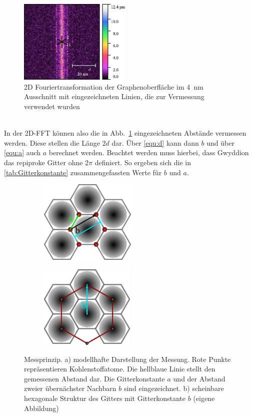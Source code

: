 \documentclass[a4paper,twoside,final]{article}
\begin{document}
\begin{figure}[htp]
  \centering
  \vspace{-3mm}
    \includegraphics[height=4cm]{Bilder/Image02001_2DFFT.pdf}
    \caption{2D Fouriertransformation der Graphenoberfläche im \SI{4}{\nano\meter} Ausschnitt mit eingezeichneten Linien, die zur Vermessung verwendet wurden}
    \label{fig:2DFFT_Graphen}
\end{figure}\\
In der 2D-FFT können also die in Abb.~\ref{fig:2DFFT_Graphen} eingezeichneten Abstände vermessen werden. Diese stellen die Länge $2d$ dar. Über \eqref{equ:d} kann dann $b$ und über \eqref{equ:a} auch $a$ berechnet werden. Beachtet werden muss hierbei, dass Gwyddion das repiproke Gitter ohne $2\pi$ definiert. So ergeben sich die in \ref{tab:Gitterkonstante} zusammengefassten Werte für $b$ und $a$.
\begin{figure}[htp]
    \centering
    \begin{subfigure}{0.45\textwidth}
        \includegraphics[height=4cm]{Bilder/Graphen_in_Messung.pdf}
        \caption{ }
        \label{fig:MessungModella}
    \end{subfigure}
    \hspace{0.5cm}
    \begin{subfigure}{0.45\textwidth}
        \includegraphics[height=4cm]{Bilder/HexagonalesGitter.pdf}
        \caption{ }
        \label{fig:MessungModellb}
    \end{subfigure}
    \caption{Messprinzip. a) modellhafte Darstellung der Messung. Rote Punkte repräsentieren Kohlenstoffatome. Die hellblaue Linie stellt den gemessenen Abstand dar. Die Gitterkonstante $a$ und der Abstand zweier übernächster Nachbarn $b$ sind eingezeichnet. b) scheinbare hexagonale Struktur des Gitters mit Gitterkonstante $b$ (eigene Abbildung)}
\end{figure}
\end{document}
